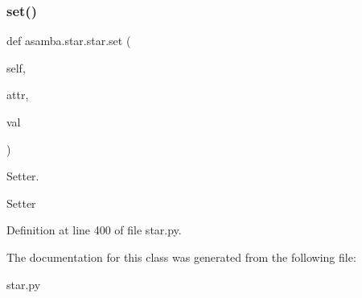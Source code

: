 \mbox{\label{classasamba_1_1star_1_1star_af0cfdd4049f081617d13919decddc5af}} 
\subsubsection{\texorpdfstring{set()}{set()}}
{\footnotesize\ttfamily def asamba.\+star.\+star.\+set (\begin{DoxyParamCaption}\item[{}]{self,  }\item[{}]{attr,  }\item[{}]{val }\end{DoxyParamCaption})}



Setter. 

\begin{DoxyVerb}Setter \end{DoxyVerb}
 

Definition at line 400 of file star.\+py.



The documentation for this class was generated from the following file\+:\begin{DoxyCompactItemize}
\item 
star.\+py\end{DoxyCompactItemize}
